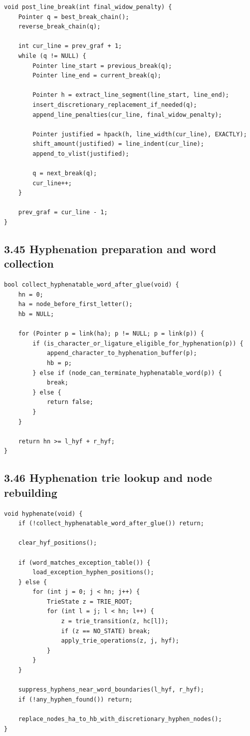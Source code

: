 \documentclass[11pt]{article}
\begin{document}
\begin{verbatim}
void post_line_break(int final_widow_penalty) {
    Pointer q = best_break_chain();
    reverse_break_chain(q);

    int cur_line = prev_graf + 1;
    while (q != NULL) {
        Pointer line_start = previous_break(q);
        Pointer line_end = current_break(q);

        Pointer h = extract_line_segment(line_start, line_end);
        insert_discretionary_replacement_if_needed(q);
        append_line_penalties(cur_line, final_widow_penalty);

        Pointer justified = hpack(h, line_width(cur_line), EXACTLY);
        shift_amount(justified) = line_indent(cur_line);
        append_to_vlist(justified);

        q = next_break(q);
        cur_line++;
    }

    prev_graf = cur_line - 1;
}
\end{verbatim}

\subsection{3.45 Hyphenation preparation and word
collection}\label{hyphenation-preparation-and-word-collection}

\begin{verbatim}
bool collect_hyphenatable_word_after_glue(void) {
    hn = 0;
    ha = node_before_first_letter();
    hb = NULL;

    for (Pointer p = link(ha); p != NULL; p = link(p)) {
        if (is_character_or_ligature_eligible_for_hyphenation(p)) {
            append_character_to_hyphenation_buffer(p);
            hb = p;
        } else if (node_can_terminate_hyphenatable_word(p)) {
            break;
        } else {
            return false;
        }
    }

    return hn >= l_hyf + r_hyf;
}
\end{verbatim}

\subsection{3.46 Hyphenation trie lookup and node
rebuilding}\label{hyphenation-trie-lookup-and-node-rebuilding}

\begin{verbatim}
void hyphenate(void) {
    if (!collect_hyphenatable_word_after_glue()) return;

    clear_hyf_positions();

    if (word_matches_exception_table()) {
        load_exception_hyphen_positions();
    } else {
        for (int j = 0; j < hn; j++) {
            TrieState z = TRIE_ROOT;
            for (int l = j; l < hn; l++) {
                z = trie_transition(z, hc[l]);
                if (z == NO_STATE) break;
                apply_trie_operations(z, j, hyf);
            }
        }
    }

    suppress_hyphens_near_word_boundaries(l_hyf, r_hyf);
    if (!any_hyphen_found()) return;

    replace_nodes_ha_to_hb_with_discretionary_hyphen_nodes();
}
\end{verbatim}
\end{document}
